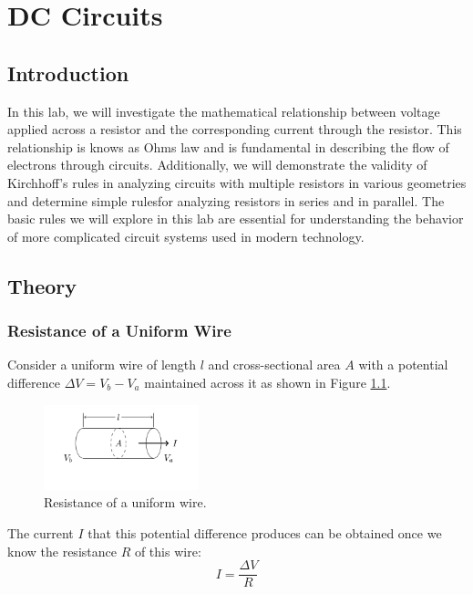 \chapter{DC Circuits}

\section{Introduction}

In this lab, we will investigate the mathematical relationship between voltage applied across a resistor and the corresponding current through the resistor. This relationship is knows as Ohms law and is fundamental in describing the flow of electrons through circuits. Additionally, we will demonstrate the validity of Kirchhoff's rules in analyzing circuits with multiple resistors in various geometries and determine simple rulesfor analyzing resistors in series and in parallel. The basic rules we will explore in this lab are essential for understanding the behavior of more complicated circuit systems used in modern technology.

\section{Theory}
\subsection{Resistance of a Uniform Wire}

Consider a uniform wire of length $l$ and cross-sectional area $A$ with a potential difference $\Delta V = V_b - V_a$ maintained across it as shown in Figure \ref{fig:cross-sec}.\myskip

\begin{figure}[h]
\centering
\includegraphics[width=0.4\textwidth]{./Exp2/pic/wireresistance.png}
\caption{Resistance of a uniform wire.}
\label{fig:cross-sec}
\end{figure}

The current $I$ that this potential difference produces can be obtained once we know the resistance $R$ of this wire:
\begin{equation}
	I = \frac{\Delta V}{R}
\end{equation}

